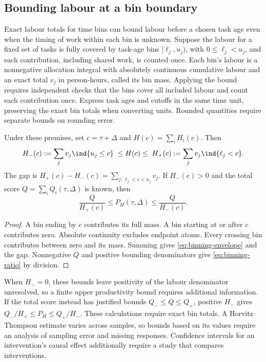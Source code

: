 \subsection{Bounding labour at a bin boundary}
\label{sec:binning-bounds}

Exact labour totals for time bins can bound labour before a chosen task age even when the timing of work within each bin is unknown. Suppose the labour for a fixed set of tasks is fully covered by task-age bins $[\ell_j,u_j)$, with $0\leq\ell_j<u_j$, and each contribution, including shared work, is counted once. Each bin's labour is a nonnegative allocation integral with absolutely continuous cumulative labour and an exact total $v_j$ in person-hours, called its bin mass. Applying the bound requires independent checks that the bins cover all included labour and count each contribution once. Express task ages and cutoffs in the same time unit, preserving the exact bin totals when converting units. Rounded quantities require separate bounds on rounding error.

\begin{proposition}
\label{prop:binning-bounds}
Under these premises, set $c=\tau+\Delta$ and $H(c)=\sum_i H_i(c)$. Then
\begin{equation}
\label{eq:binning-envelope}
 H_-(c):=\sum_jv_j\ind\{u_j\leq c\}
 \;\leq H(c)\leq\;
 H_+(c):=\sum_jv_j\ind\{\ell_j<c\}.
\end{equation}
The gap is $H_+(c)-H_-(c)=\sum_{j:\,\ell_j<c<u_j}v_j$. If $H_-(c)>0$ and the total score $Q=\sum_iQ_i(\tau,\Delta)$ is known, then
\begin{equation}
\label{eq:binning-ratio}
 \frac{Q}{H_+(c)}\leq P_H(\tau,\Delta)\leq\frac{Q}{H_-(c)}.
\end{equation}
\end{proposition}
\begin{proof}
A bin ending by $c$ contributes its full mass. A bin starting at or after $c$ contributes zero. Absolute continuity excludes endpoint atoms. Every crossing bin contributes between zero and its mass. Summing gives \eqref{eq:binning-envelope} and the gap. Nonnegative $Q$ and positive bounding denominators give \eqref{eq:binning-ratio} by division.
\end{proof}

When $H_-=0$, these bounds leave positivity of the labour denominator unresolved, so a finite upper productivity bound requires additional information. If the total score instead has justified bounds $Q_-\leq Q\leq Q_+$, positive $H_-$ gives $Q_-/H_+\leq P_H\leq Q_+/H_-$. These calculations require exact bin totals. A Horvitz--Thompson estimate varies across samples, so bounds based on its values require an analysis of sampling error and missing responses. Confidence intervals for an intervention's causal effect additionally require a study that compares interventions.

